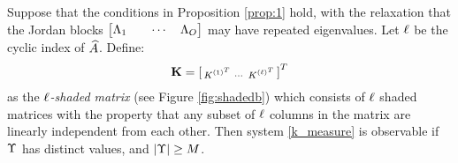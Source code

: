 \begin{theorem}\label{thm:1}
 Suppose that the conditions in Proposition \ref{prop:1} hold, with the relaxation that the Jordan blocks $\begin{bmatrix}\Lambda_1 & &\cdots & \Lambda_{O}\end{bmatrix}$ may have repeated eigenvalues. Let $\ell$ be the cyclic index of $\widehat{A}$. Define:
 \begin{align}\eqlabel{empKShadFull}
  \empKShadFull = \left[\begin{smallmatrix}
                    \empK^{{(1)}^T} & 
                    \cdots &
                    \empK^{{(\minmeas)}^T}
                  \end{smallmatrix}\right]^T
 \end{align}
 as the \emph{$\ell$-shaded matrix} (see Figure \ref{fig:shadedb}) which consists of $\ell$ shaded matrices with the property that any subset of
 $\ell$
 columns in the matrix are linearly independent from each
 other. Then system \eqref{k_measure} is observable if $\Upsilon$ has distinct values, and $|\Upsilon| \geq M$.
\end{theorem}

